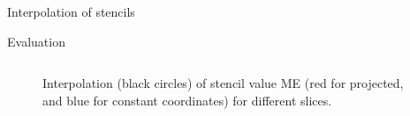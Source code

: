 \documentclass[a4paper,11pt,reqno]{amsart}
\numberwithin{figure}{section}
\numberwithin{table}{section}
\numberwithin{figure}{subsection}
\begin{document}
\begin{section}{Interpolation of stencils}
\begin{subsection}{Evaluation}
\begin{figure}
\begin{tabular}{@{}cc@{}}
\end{tabular}
\caption{Interpolation (black circles) of stencil value ME (red for projected, and 
blue for constant coordinates) for different slices.
\label{fig:stencilInterpolateME}}
\end{figure}  



% 
% 
% 
% 
% 
% 
% 
% 
% 
% 
% 
% 
% 
\end{subsection}



\end{section}
\end{document}
